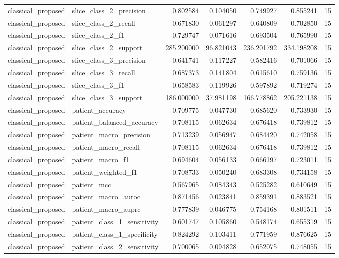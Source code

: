 \begin{tabular}{llrrrrr}
classical_proposed & slice_class_2_precision & 0.802584 & 0.104050 & 0.749927 & 0.855241 & 15 \\
classical_proposed & slice_class_2_recall & 0.671830 & 0.061297 & 0.640809 & 0.702850 & 15 \\
classical_proposed & slice_class_2_f1 & 0.729747 & 0.071616 & 0.693504 & 0.765990 & 15 \\
classical_proposed & slice_class_2_support & 285.200000 & 96.821043 & 236.201792 & 334.198208 & 15 \\
classical_proposed & slice_class_3_precision & 0.641741 & 0.117227 & 0.582416 & 0.701066 & 15 \\
classical_proposed & slice_class_3_recall & 0.687373 & 0.141804 & 0.615610 & 0.759136 & 15 \\
classical_proposed & slice_class_3_f1 & 0.658583 & 0.119926 & 0.597892 & 0.719274 & 15 \\
classical_proposed & slice_class_3_support & 186.000000 & 37.981198 & 166.778862 & 205.221138 & 15 \\
classical_proposed & patient_accuracy & 0.709775 & 0.047730 & 0.685620 & 0.733930 & 15 \\
classical_proposed & patient_balanced_accuracy & 0.708115 & 0.062634 & 0.676418 & 0.739812 & 15 \\
classical_proposed & patient_macro_precision & 0.713239 & 0.056947 & 0.684420 & 0.742058 & 15 \\
classical_proposed & patient_macro_recall & 0.708115 & 0.062634 & 0.676418 & 0.739812 & 15 \\
classical_proposed & patient_macro_f1 & 0.694604 & 0.056133 & 0.666197 & 0.723011 & 15 \\
classical_proposed & patient_weighted_f1 & 0.708733 & 0.050240 & 0.683308 & 0.734158 & 15 \\
classical_proposed & patient_mcc & 0.567965 & 0.084343 & 0.525282 & 0.610649 & 15 \\
classical_proposed & patient_macro_auroc & 0.871456 & 0.023841 & 0.859391 & 0.883521 & 15 \\
classical_proposed & patient_macro_auprc & 0.777839 & 0.046775 & 0.754168 & 0.801511 & 15 \\
classical_proposed & patient_class_1_sensitivity & 0.601747 & 0.105860 & 0.548174 & 0.655319 & 15 \\
classical_proposed & patient_class_1_specificity & 0.824292 & 0.103411 & 0.771959 & 0.876625 & 15 \\
classical_proposed & patient_class_2_sensitivity & 0.700065 & 0.094828 & 0.652075 & 0.748055 & 15 \\

\end{tabular}
